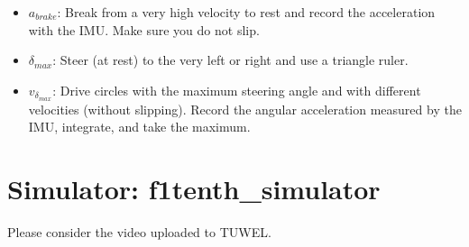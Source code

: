 \documentclass[letta4 paper]{article}
\numberwithin{equation}{section}
\newcommand{\0}{\mathbf{0}}
\begin{document}
\begin{enumerate}[a.) ]
\begin{itemize}
         \item $a_{brake}$: Break from a very high velocity to rest and record the acceleration with the IMU. Make sure you do not slip.
         \item $\delta_{max}$: Steer (at rest) to the very left or right and use a triangle ruler.
         \item $v_{\delta_{max}}$: Drive circles with the maximum steering angle and with different velocities (without slipping). Record the angular acceleration measured by the IMU, integrate, and take the maximum.
      \end{itemize}
   \end{enumerate}

	\section{Simulator: f1tenth\_simulator}
	
   Please consider the video uploaded to TUWEL.

	\sloppy
   \printbibliography
\end{document}
